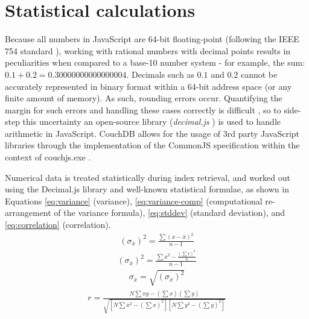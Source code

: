 \section{Statistical calculations}
Because all numbers in JavaScript are 64-bit floating-point (following the IEEE 754 standard \cite{floatingPoint}), working with rational numbers with decimal points results in peculiarities when compared to a base-10 number system - for example, the sum: $0.1 + 0.2 = 0.30000000000000004$. Decimals such as $0.1$ and $0.2$ cannot be accurately represented in binary format within a 64-bit address space (or any finite amount of memory). As such, rounding errors occur. Quantifying the margin for such errors and handling these cases correctly is difficult \cite{Goldberg1991}, so to side-step this uncertainty an open-source library (\textit{decimal.js} \cite{decimaljs}) is used to handle arithmetic in JavaScript. CouchDB allows for the usage of 3rd party JavaScript libraries through the implementation of the CommonJS specification within the context of couchjs.exe \cite{commonJsMapFn}.

Numerical data is treated statistically during index retrieval, and worked out using the Decimal.js library and well-known statistical formulae, as shown in Equations \ref{eq:variance} (variance), \ref{eq:variance-comp} (computational re-arrangement of the variance formula), \ref{eq:stddev} (standard deviation), and \ref{eq:correlation} (correlation).
\begin{align}
    (\sigma_{\overline{x}})^{2} = \frac{\sum{(x-\bar{x})^2}}{n-1}\label{eq:variance}
\end{align}
\begin{align}
    (\sigma_{\overline{x}})^{2} =  \frac{\sum{x^2} - \frac{(\sum{x})^2}{n}}{n - 1}\label{eq:variance-comp}
\end{align}
\begin{align}
    \sigma_{\overline{x}} = \sqrt{(\sigma_{\overline{x}})^{2}}\label{eq:stddev}
\end{align}
\begin{align}
    r = \frac{N\sum{xy} - (\sum{x})(\sum{y})}{\sqrt{[N\sum{x^2} - (\sum{x})^2][N\sum{y^2} - (\sum{y})^2]}} \label{eq:correlation}
\end{align}
